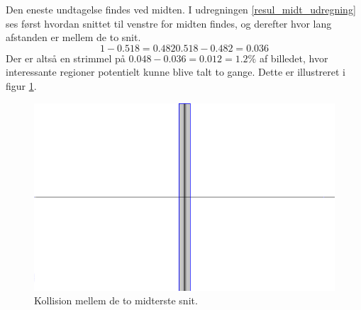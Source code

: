 {Den eneste undtagelse findes ved midten. I udregningen
\ref{resul_midt_udregning} ses først hvordan snittet til venstre for
midten findes, og derefter hvor lang afstanden er mellem de to snit.
\begin{equation}\label{resul_midt_udregningen}
    1-0.518 = 0.482
    0.518-0.482 = 0.036
\end{equation}
Der er altså en strimmel på $0.048-0.036 = 0.012 = 1.2\%$ af
billedet, hvor interessante regioner potentielt kunne blive talt to gange.
Dette er illustreret i figur \ref{resultat_fejl_midt}.
\begin{figure}[!h]
	\centering
	\includegraphics[scale=0.5]{afsnit/resultater/billeder/midt_strimmel}
	\caption{Kollision mellem de to midterste snit.}
	\label{resultat_fejl_midt}
\end{figure}

}

